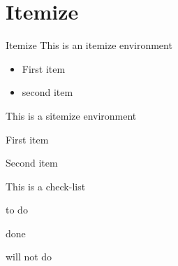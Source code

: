 %
%
\section{Itemize}\label{sec:itemize}
\begin{frame}{Itemize}
  This is an itemize environment\\
  \begin{itemize}
    \item First item
    \item second item
  \end{itemize}

  This is a sitemize environment\\
  \begin{sitemize}[margin=30pt,sitemsep=0.4cm]
    \item First item
    \item Second item
  \end{sitemize}

  This is a check-list\\
  \begin{sitemize}
    \item[\todo] to do
    \item[\done] done
    \item[\wontdo] will not do
  \end{sitemize}
\end{frame}

